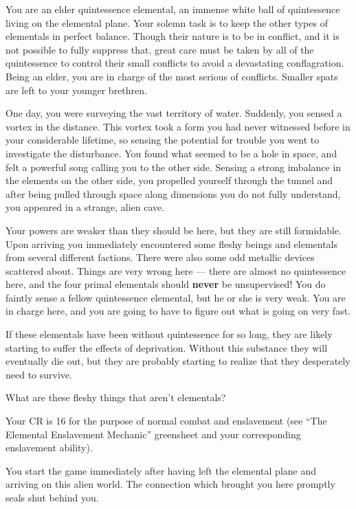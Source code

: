 \documentclass[char]{elementals}
\begin{document}
\name{\cElderQ{}}

You are an elder quintessence elemental, an immense white ball of quintessence living on the elemental plane.  Your solemn task is to keep the other types of elementals in perfect balance.  Though their nature is to be in conflict, and it is not possible to fully suppress that, great care must be taken by all of the quintessence to control their small conflicts to avoid a devastating conflagration. Being an elder, you are in charge of the most serious of conflicts. Smaller spats are left to your younger brethren.

One day, you were surveying the vast territory of water. Suddenly, you sensed a vortex in the distance. This vortex took a form you had never witnessed before in your considerable lifetime, so sensing the potential for trouble you went to investigate the disturbance. You found what seemed to be a hole in space, and felt a powerful song calling you to the other side. Sensing a strong imbalance in the elements on the other side, you propelled yourself through the tunnel and after being pulled through space along dimensions you do not fully understand, you appeared in a strange, alien cave.

Your powers are weaker than they should be here, but they are still formidable. Upon arriving you immediately encountered some fleshy beings and elementals from several different factions. There were also some odd metallic devices scattered about. Things are very wrong here --- there are almost no quintessence here, and the four primal elementals should \textbf{never} be unsupervised! You do faintly sense a fellow quintessence elemental, but he or she is very weak. You are in charge here, and you are going to have to figure out what is going on very fast.

If these elementals have been without quintessence for so long, they are likely starting to suffer the effects of \iWhiteQ{} deprivation. Without this substance they will eventually die out, but they are probably starting to realize that they desperately need \iWhiteQ{\MYname{}} to survive.

What are these fleshy things that aren't elementals?

Your CR is 16 for the purpose of normal combat and enslavement (see ``The Elemental Enslavement Mechanic'' greensheet and your corresponding enslavement ability).

You start the game immediately after having left the elemental plane and arriving on this alien world. The connection which brought you here promptly seals shut behind you.
\end{document}
